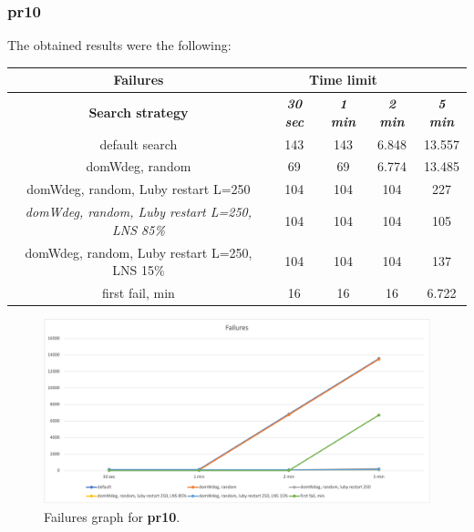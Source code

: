 \subsubsection{pr10}
\label{subsubsec:pr10}
The obtained results were the following:
{
\renewcommand{\arraystretch}{2}
\begin{longtable}[h]{| c | c | c | c | c |}
    \hline
    \textbf{Failures} & \multicolumn{3}{c}{Time limit} & \\
    \hline
    \textbf{Search strategy} & \textbf{\textit{30 sec}} & \textbf{\textit{1 min}} & \textbf{\textit{2 min}} & \textbf{\textit{5 min}} \\
    \hline
    \endhead
    default search                                         & 143 &  143 &  6.848 & 13.557 \\
    \hline
    domWdeg, random                                        &  69 &   69 &  6.774 & 13.485 \\
    \hline
    domWdeg, random, Luby restart L=250                    & 104 &  104 &  104 &    227 \\
    \hline
    \textit{domWdeg, random, Luby restart L=250, LNS 85\%} & 104 &  104 &  104 &    105 \\
    \hline
    domWdeg, random, Luby restart L=250, LNS 15\%          & 104 &  104 &  104 &    137 \\
    \hline
    first fail, min                                        &  16 &   16 &   16 &   6.722 \\
    \hline
\end{longtable}
}
\begin{figure}[H]
    \centering
    \includegraphics[width=0.8\columnwidth]{../graphs/pr10-failures.png}
    \caption{Failures graph for \textbf{pr10}.}
\end{figure}

